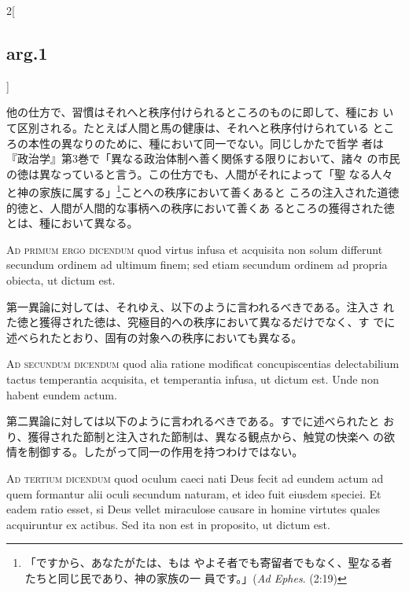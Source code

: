 \documentclass[paper=a4paper,fontsize=10pt,jafontsize=9pt,titlepage]{jlreq}
\begin{document}
\begin{paracol}{2}[\subsection{arg.1}]
\switchcolumn

他の仕方で、習慣はそれへと秩序付けられるところのものに即して、種にお
 いて区別される。たとえば人間と馬の健康は、それへと秩序付けられている
 ところの本性の異なりのために、種において同一でない。同じしかたで哲学
 者は『政治学』第3巻で「異なる政治体制へ善く関係する限りにおいて、諸々
 の市民の徳は異なっていると言う。この仕方でも、人間がそれによって「聖
 なる人々と神の家族に属する」\footnote{「ですから、あなたがたは、もは
 やよそ者でも寄留者でもなく、聖なる者たちと同じ民であり、神の家族の一
 員です。」({\itshape Ad Ephes}. (2:19)}ことへの秩序において善くあると
 ころの注入された道徳的徳と、人間が人間的な事柄への秩序において善くあ
 るところの獲得された徳とは、種において異なる。

\switchcolumn*[\subsection{ad.1}]

{\scshape Ad primum ergo dicendum} quod virtus infusa et acquisita non
solum differunt secundum ordinem ad ultimum finem; sed etiam secundum
ordinem ad propria obiecta, ut dictum est.

\switchcolumn

第一異論に対しては、それゆえ、以下のように言われるべきである。注入さ
 れた徳と獲得された徳は、究極目的への秩序において異なるだけでなく、す
 でに述べられたとおり、固有の対象への秩序においても異なる。

\switchcolumn*[\subsection{ad.2}]

{\scshape Ad secundum dicendum} quod alia ratione modificat
concupiscentias delectabilium tactus temperantia acquisita, et
temperantia infusa, ut dictum est. Unde non habent eundem actum.

\switchcolumn

第二異論に対しては以下のように言われるべきである。すでに述べられたと
 おり、獲得された節制と注入された節制は、異なる観点から、触覚の快楽へ
 の欲情を制御する。したがって同一の作用を持つわけではない。

\switchcolumn*[\subsection{ad.3}]

{\scshape Ad tertium dicendum} quod oculum caeci nati Deus fecit ad
eundem actum ad quem formantur alii oculi secundum naturam, et ideo
fuit eiusdem speciei. Et eadem ratio esset, si Deus vellet miraculose
causare in homine virtutes quales acquiruntur ex actibus. Sed ita non
est in proposito, ut dictum est.


\end{paracol}
\end{document}

